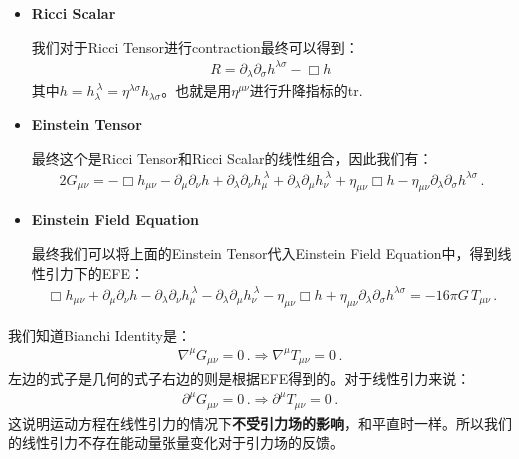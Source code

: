 \begin{itemize}
  \item \textbf{Ricci Scalar}

    我们对于Ricci Tensor进行contraction最终可以得到：
    \begin{align}
      R = \partial_\lambda \partial_\sigma h^{\lambda\sigma} - \Box h \,
    \end{align}
    其中$ h = h_\lambda^{\ \lambda} = \eta^{\lambda\sigma}
    h_{\lambda\sigma} $。也就是用$ \eta^{\mu\nu} $进行升降指标的tr.
  \item \textbf{Einstein Tensor}

    最终这个是Ricci Tensor和Ricci Scalar的线性组合，因此我们有：
    \begin{align}
      2 G_{\mu\nu} = -\Box h_{\mu\nu} - \partial_\mu \partial_\nu h
      + \partial_\lambda \partial_\nu h_{\mu}^{\ \lambda}
      + \partial_\lambda \partial_\mu h_{\nu}^{\ \lambda}
      + \eta_{\mu\nu} \Box h
      - \eta_{\mu\nu} \partial_\lambda \partial_\sigma h^{\lambda\sigma} \, .
    \end{align}
  \item \textbf{Einstein Field Equation}

    最终我们可以将上面的Einstein Tensor代入Einstein Field Equation中，得到线性引力下的EFE：
    \begin{align}
      \Box h_{\mu\nu} + \partial_\mu \partial_\nu h
      - \partial_\lambda \partial_\nu h_{\mu}^{\ \lambda}
      - \partial_\lambda \partial_\mu h_{\nu}^{\ \lambda}
      - \eta_{\mu\nu} \Box h
      + \eta_{\mu\nu} \partial_\lambda \partial_\sigma h^{\lambda\sigma}
      = -16\pi G\, T_{\mu\nu} \, .
    \end{align}
\end{itemize}

\bigskip
{}

我们知道Bianchi Identity是：
\begin{align}
  \nabla^\mu G_{\mu\nu} = 0 \, . \Rightarrow \nabla^\mu T_{\mu\nu} = 0 \, .
\end{align}
左边的式子是几何的式子右边的则是根据EFE得到的。对于线性引力来说：
\begin{align}
  \partial^{\mu} G_{\mu\nu} = 0 \, .\Rightarrow \partial^{\mu}
  T_{\mu\nu} = 0 \, .
\end{align}
这说明运动方程在线性引力的情况下\textbf{不受引力场的影响}，和平直时一样。所以我们的线性引力不存在能动量张量变化对于引力场的反馈。

